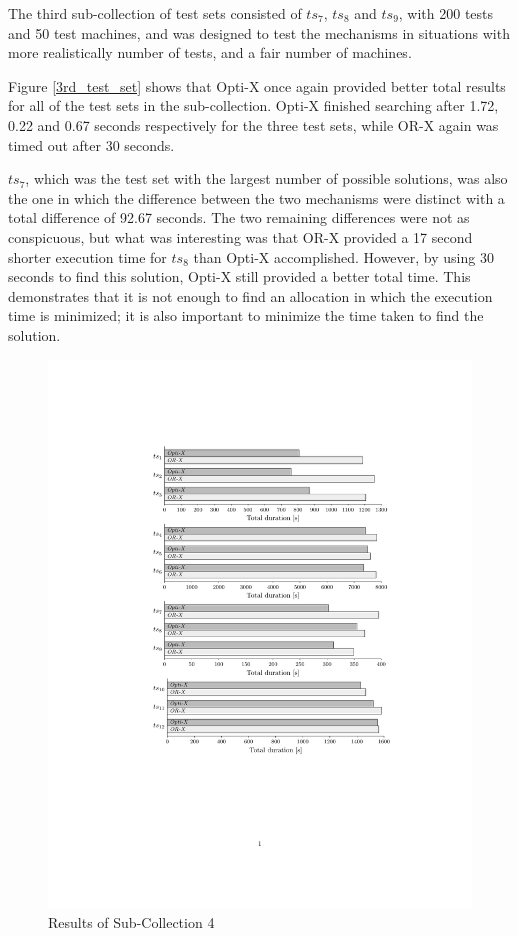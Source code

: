 The third sub-collection of test sets consisted of $ts_7$, $ts_8$ and $ts_9$, with 200 tests and 50 test machines, and was designed to test the mechanisms in situations with more realistically number of tests, and a fair number of machines.

Figure \ref{3rd_test_set} shows that Opti-X once again provided better total results for all of the test sets in the sub-collection. Opti-X finished searching after 1.72, 0.22 and 0.67 seconds respectively for the three test sets, while OR-X again was timed out after 30 seconds.

$ts_7$, which was the test set with the largest number of possible solutions, was also the one in which the difference between the two mechanisms were distinct with a total difference of 92.67 seconds. The two remaining differences were not as conspicuous, but what was interesting was that OR-X provided a 17 second shorter execution time for $ts_8$ than Opti-X accomplished. However, by using 30 seconds to find this solution, Opti-X still provided a better total time. This demonstrates that it is not enough to find an allocation in which the execution time is minimized; it is also important to minimize the time taken to find the solution. 

\begin{figure}[h]
    \centering
    \includegraphics[width=\textwidth]{figures/test_results/4th.pdf}
    \caption{Results of Sub-Collection 4}
    \label{4th_test_set}
\end{figure}

